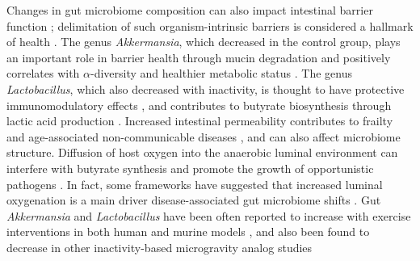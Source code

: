 \documentclass[preprint,12pt,authoryear]{elsarticle}
\begin{document}
    Changes in gut microbiome composition can also impact intestinal barrier function \citep{mccallumGutMicrobiotaIts2024}; delimitation of such organism-intrinsic barriers is considered a hallmark of health \citep{lopez-otinHallmarksHealth2021}. The genus \textit{Akkermansia}, which decreased in the control group, plays an important role in barrier health through mucin degradation \citep{derrienAkkermansiaMuciniphilaGen2004, raimondiIdentificationMucinDegraders2021} and positively correlates with $\alpha$-diversity and healthier metabolic status \citep{raimondiIdentificationMucinDegraders2021, daoAkkermansiaMuciniphilaImproved2016}. The genus \textit{Lactobacillus}, which also decreased with inactivity, is thought to have protective immunomodulatory effects \citep{rastogiGutMicrobiomeHuman2022}, and contributes to butyrate biosynthesis through lactic acid production \citep{salvettiComparativeGenomicsGenus2018, daisleyEmergingConnectionsGut2021}. Increased intestinal permeability contributes to frailty and age-associated non-communicable diseases \citep{gomaaHumanGutMicrobiota2020, jacksonSignaturesEarlyFrailty2016}, and can also affect microbiome structure. Diffusion of host oxygen into the anaerobic luminal environment can interfere with butyrate synthesis and promote the growth of opportunistic pathogens \citep{litvakColonocyteMetabolismShapes2018}. In fact, some frameworks have suggested that increased luminal oxygenation is a main driver disease-associated gut microbiome shifts \citep{rigottier-goisDysbiosisInflammatoryBowel2013, rivera-chavezOxygenDriverGut2017}. Gut \textit{Akkermansia} and \textit{Lactobacillus} have been often reported to increase with exercise interventions in both human and murine models \citep{hintikkaAerobicExerciseTraining2023, karlChangesIntestinalMicrobiota2017, queipo-ortunoGutMicrobiotaComposition2013, choiExerciseAttenuatesPCBInduced2013, petrizExerciseInductionGut2014, mohrAthleticGutMicrobiota2020}, and also been found to decrease in other inactivity-based microgravity analog studies \citep{chenHumanMetabolicResponses2016, liuEffectsSpaceflightComposition2020}
\end{document}
